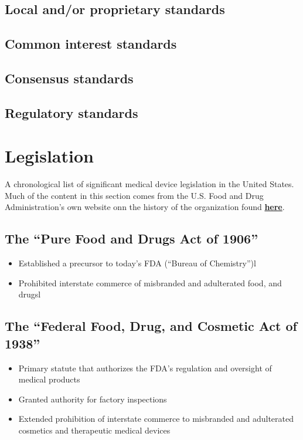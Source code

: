 \documentclass[11pt]{book}
\begin{document}
\subsection{Local and/or proprietary standards}
\subsection{Common interest standards}
\subsection{Consensus standards}
\subsection{Regulatory standards}

\newpage
\section{Legislation}
A chronological list of significant medical device legislation in the United States. Much of the content in this section comes from the U.S. Food and Drug Administration's own website onn the history of the organization found \href{https://www.fda.gov/MedicalDevices/DeviceRegulationandGuidance/Overview/ucm618375.htm}{\textbf{here}}.

\subsection{The ``Pure Food and Drugs Act of 1906''}
\begin{itemize}
	\item Established a precursor to today’s FDA (``Bureau of Chemistry'')l
	\item Prohibited interstate commerce of misbranded and adulterated food, and drugsl
\end{itemize}

\subsection{The ``Federal Food, Drug, and Cosmetic Act of 1938''}
\begin{itemize}
	\item Primary statute that authorizes the FDA’s regulation and oversight of medical products
	\item Granted authority for factory inspections
	\item Extended prohibition of interstate commerce to misbranded and adulterated cosmetics and therapeutic medical devices
\end{itemize}
\end{document}
